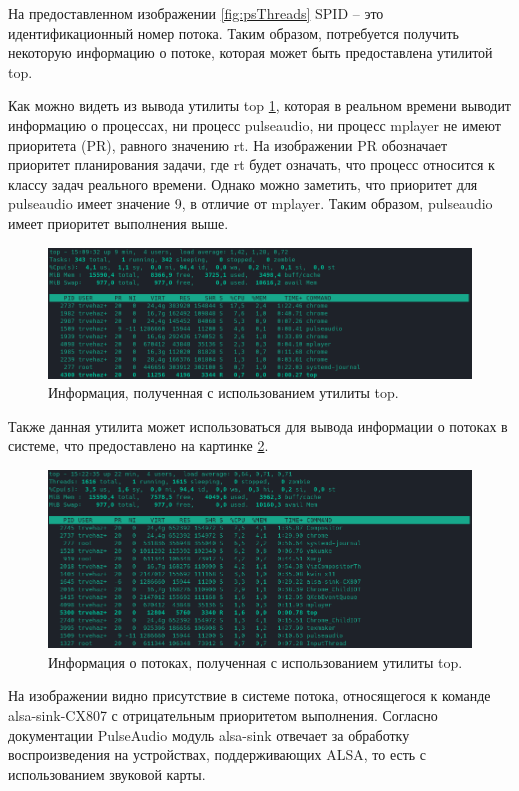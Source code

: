 На предоставленном изображении \ref{fig:psThreads} SPID -- это идентификационный номер потока. Таким образом, потребуется получить некоторую информацию о потоке, которая может быть предоставлена утилитой top.

Как можно видеть из вывода утилиты top \ref{fig:topMPlayer}, которая в реальном времени выводит информацию о процессах, ни процесс pulseaudio, ни процесс mplayer не имеют приоритета (PR), равного значению rt. На изображении PR обозначает приоритет планирования задачи, где rt будет означать, что процесс относится к классу задач реального времени. Однако можно заметить, что приоритет для pulseaudio имеет значение 9, в отличие от mplayer. Таким образом, pulseaudio имеет приоритет выполнения выше.

\begin{figure}[H]
	\centering
	\includegraphics[scale=0.65]{img/topMPlayer.png}
	\caption{Информация, полученная с использованием утилиты top. }
	\label{fig:topMPlayer}
\end{figure}

Также данная утилита может использоваться для вывода информации о потоках в системе, что предоставлено на картинке \ref{fig:topMPlayerThreads}.

\begin{figure}[H]
	\centering
	\includegraphics[scale=0.65]{img/topMPlayerThreads.png}
	\caption{Информация о потоках, полученная с использованием утилиты top. }
	\label{fig:topMPlayerThreads}
\end{figure}

На изображении видно присутствие в системе потока, относящегося к команде alsa-sink-CX807 с отрицательным приоритетом выполнения. Согласно документации PulseAudio \cite{pulseAudioDocumentation} модуль alsa-sink отвечает за обработку воспроизведения на устройствах, поддерживающих ALSA, то есть с использованием звуковой карты.

